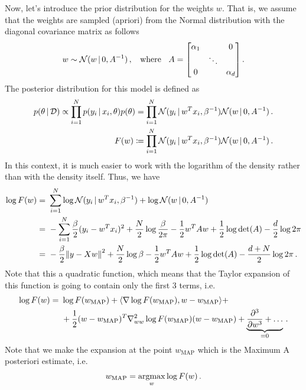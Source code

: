 Now, let's introduce the prior distribution for the weights $w$.
That is, we assume that the weights are sampled (apriori) from the Normal distribution with the diagonal covariance matrix as follows
\begin{align}
    w \sim \Normal(w\cond 0,A^{-1})\,,\;\;\text{ where }\;\; 
    A = \begin{bmatrix}
        \alpha_1 & & 0\\
        & \ddots & \\
        0 & & \alpha_d
    \end{bmatrix}\,.
\end{align}
The posterior distribution for this model is defined as
\begin{align}
    p(\theta\,|\, \mathcal{D}) \propto \prod_{i=1}^N p(y_i\,|\, x_i,\theta) p(\theta) = \prod_{i=1}^N \mathcal{N}(y_i\,|\, w^Tx_i, \beta^{-1})\mathcal{N}(w\,|\, 0, A^{-1})\,.\\
    F(w) \coloneqq \prod_{i=1}^N \mathcal{N}(y_i\,|\, w^Tx_i, \beta^{-1})\mathcal{N}(w\,|\, 0, A^{-1})\,.
\end{align}
In this context, it is much easier to work with the logarithm of the density rather than with the density itself. Thus, we have
\begin{align}
    \log F(w) =~& \sum_{i=1}^N\log\Normal(y_i\cond w^Tx_i, \beta^{-1}) + \log\Normal(w\cond 0, A^{-1}) \\
    =~& -\sum_{i=1}^N\frac{\beta}{2}(y_i- w^Tx_i)^2 + \frac{N}{2}\log \frac{\beta}{2\pi} - \frac{1}{2}w^TAw + \frac{1}{2}\log \det(A) - \frac{d}{2}\log 2\pi\\
    =~& -\frac{\beta}{2}\norm{y-Xw}^2 + \frac{N}{2}\log \beta - \frac{1}{2}w^TAw + \frac{1}{2}\log \det(A) - \frac{d+N}{2}\log 2\pi\,.
\end{align}
Note that this a quadratic function, which means that the Taylor expansion of this function is going to contain only the first $3$ terms, i.e.
\begin{align}
    \log F(w) =~& \log F(w_{\text{MAP}}) + \inner{\nabla \log F(w_{\text{MAP}})}{w-w_{\text{MAP}}} + \\
    ~&+\frac{1}{2} (w - w_{\text{MAP}})^T \nabla^2_{ww} \log F(w_{\text{MAP}}) (w - w_{\text{MAP}}) + \underbrace{\deriv{^3}{w^3} + \ldots}_{=0}\,.
\end{align}
Note that we make the expansion at the point $w_{\text{MAP}}$ which is the Maximum A posteriori estimate, i.e.
\begin{align}
    w_{\text{MAP}} = \operatorname*{argmax}_{w} \log F(w)\,.
\end{align}
